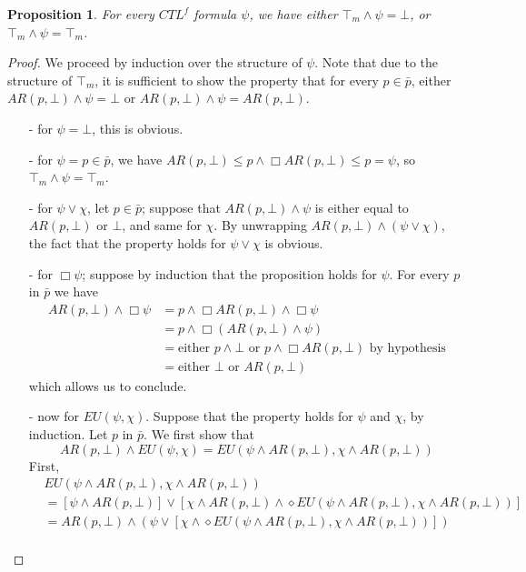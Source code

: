 \documentclass[10pt]{article}
\newcommand{\ARp}{{AR(p,\bot)}}
\newtheorem{proposition}[definition]{Proposition}
\begin{document}
\begin{proposition}
    For every $CTL^f$ formula $\psi$, we have either $\top_m\wedge\psi=\bot$, or $\top_m\wedge\psi=\top_m$.
\end{proposition}
\begin{proof}
    We proceed by induction over the structure of $\psi$. Note that due to the structure of $\top_m$, it is sufficient to show the property that for every $p\in\bar{p}$, either $\ARp\wedge\psi=\bot$ or $\ARp\wedge\psi=\ARp$.
    \begin{itemize}
        \setlength\itemsep{0em}
        \item[-] for $\psi = \bot$, this is obvious.
        \item[-] for $\psi = p\in\bar{p}$, we have $AR(p,\bot)\leq p\wedge\Box AR(p,\bot)\leq p=\psi$, so $\top_m\wedge\psi=\top_m$.
        \item[-] for $\psi\vee\chi$, let $p\in\bar{p}$; suppose that $\ARp\wedge\psi$ is either equal to $\ARp$ or $\bot$, and same for $\chi$. By unwrapping $\ARp\wedge(\psi\vee\chi)$, the fact that the property holds for $\psi\vee\chi$ is obvious.
        \item[-] for $\Box\psi$; suppose by induction that the proposition holds for $\psi$. For every $p$ in $\bar{p}$ we have
            \begin{align*}
                AR(p,\bot)\wedge\Box\psi&=p\wedge\Box AR(p,\bot)\wedge\Box\psi \\
                &=p\wedge\Box(AR(p,\bot)\wedge\psi) \\
                &=\mbox{either }p\wedge \bot \mbox{ or }p\wedge \Box AR(p,\bot)\mbox{ by hypothesis} \\
                &=\mbox{either }\bot \mbox{ or } AR(p,\bot)
            \end{align*}
            which allows us to conclude.
        \item[-] now for $EU(\psi,\chi)$. Suppose that the property holds for $\psi$ and $\chi$, by induction. Let $p$ in $\bar{p}$. We first show that \[AR(p,\bot)\wedge EU(\psi,\chi)=EU(\psi\wedge AR(p,\bot),\chi\wedge AR(p,\bot))\]
            First, 
            \begin{align*}
                &EU(\psi\wedge AR(p,\bot),\chi\wedge AR(p,\bot))\\
                &=[\psi\wedge\ARp]\vee[\chi\wedge\ARp\wedge\diamond EU(\psi\wedge AR(p,\bot),\chi\wedge AR(p,\bot))]\\
                &=\ARp\wedge(\psi\vee[\chi\wedge \diamond EU(\psi\wedge AR(p,\bot),\chi\wedge AR(p,\bot))])\\

\end{align*}
\end{itemize}
\end{proof}
\end{document}
